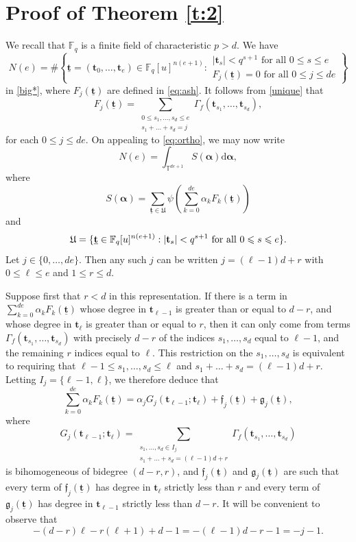 \documentclass[12pt, reqno]{amsart}
\numberwithin{equation}{section}
\renewcommand{\d}{\mathrm{d}}
\newcommand{\0}{\mathbf{0}}
\newcommand{\FF}{\mathbb{F}}
\newcommand{\TT}{\mathbb{T}}
\renewcommand{\leq}{\leqslant}
\newcommand{\bal}{\boldsymbol{\alpha}}
\renewcommand{\=}{\equiv}
\renewcommand{\t}{\mathbf{t}}
\newcommand{\1}{\mathbf{1}}
\theoremstyle{definition}
\begin{document}
\section{Proof of Theorem \ref{t:2}}
\label{sec:proof}
We recall that $\FF_q$ is a finite field of characteristic $p > d$. We have 
$$
N(e) = \#\left\{
 \underline{ \mathbf{t} } = (\t_0, \dots, \t_e) \in \FF_q[u]^{n (e + 1) } :
\begin{array}{l}
|\t_s|  < q^{s + 1} \text{ for all $0 \leq s \leq e$}  \\
F_j(  \underline{ \t }  ) = 0 \text{ for all $0 \leq j \leq d e$}
\end{array}
\right\}
$$
in  \eqref{big*},
where $F_j(  \underline{ \t }  )$  are defined in \eqref{eq:ash}. 
It follows from \eqref{unique} that 
$$
F_j( \underline{ \t }  ) =
\sum_{ \substack{ 0 \leq s_1, \dots, s_d \leq e \\ s_1 + \dots + s_d =  j }} \Gamma_f (\t_{s_1}, \dots, \t_{s_d} ),
$$
for each $0 \leq j \leq d e$. 
On appealing to \eqref{eq:ortho}, we may now write
$$
N(e) =
\int_{\TT^{de+1}}S(\bal)\d \bal,
$$
where
\begin{equation}
\label{SSS}
S(\bal) = \sum_{  \underline{\t} \in \mathfrak{U}  }  \psi \left( \sum_{k =  0 }^{d e }  \alpha_k F_k(  \underline{\t}   )
\right)
\end{equation}	
and
$$
\mathfrak{U} = \{  \underline{\t} \in   \FF_q[u]^{ n (e+1) }:   |\t_s| < q^{s + 1} \textnormal{ for all  $0 \leq s \leq e$} \}.
$$
Let $j\in \{0 ,\dots,de\}$. Then any such $j$ can be written  $j = (\ell - 1) d + r$ with $0 \leq \ell \leq e$ and  $1 \leq r \leq d$.

Suppose first  that $r<d$ in this representation. 
If there is a term in $\sum_{k =  0 }^{d e }  \alpha_{k} F_{k}(  \underline{\t})$ whose
degree in $\t_{\ell - 1}$ is  greater than or equal to $d - r$,
and whose degree in $\t_{\ell}$ is greater than or equal to $r$, then it can only come from terms
$\Gamma_f (\t_{s_1}, \dots, \t_{s_d} )$ with precisely $d - r$ of the indices $s_1, \dots, s_d$ equal to  $\ell - 1$,
and the remaining $r$ indices equal to $\ell$. This restriction on the $s_1, \dots, s_d$ is equivalent to
requiring that $\ell - 1 \leq s_1, \dots, s_d \leq \ell$ and $s_1 + \dots + s_d =  (\ell - 1) d + r$. 
Letting $I_j = \{ \ell - 1, \ell \}$, 
 we therefore  deduce that 
 $$
\sum_{k =  0 }^{d e }  \alpha_{k} F_{k}(  \underline{\t})  =  \alpha_j G_j(\t_{\ell - 1} ;  \t_{\ell} ) + \mathfrak{f}_j (\underline{\t} ) + \mathfrak{g}_j (\underline{\t}),
$$
where
$$
G_j(\t_{\ell - 1} ;  \t_{\ell} ) = \sum_{ \substack{ s_1, \dots, s_d \in I_j  \\ s_1 + \dots + s_d =  (\ell - 1) d + r }} \Gamma_f (\t_{s_1}, \dots, \t_{s_d} )
$$
is bihomogeneous of bidegree $(d-r, r)$, and
$\mathfrak{f}_j (\underline{\t} )$ and $\mathfrak{g}_j (\underline{\t})$
are such that every term of $\mathfrak{f}_j (\underline{\t})$  has degree in $\t_{\ell}$ strictly less than $r$ and every term of
$\mathfrak{g}_j (\underline{\t}) $ has degree in $\t_{\ell - 1}$  strictly less than $d - r$.
It will be convenient to observe that
\begin{equation}
\label{j1}
- (d - r) \ell -  r (\ell + 1) + d - 1 = - (\ell - 1) d -  r  - 1 = - j - 1.
\end{equation}
\end{document}
